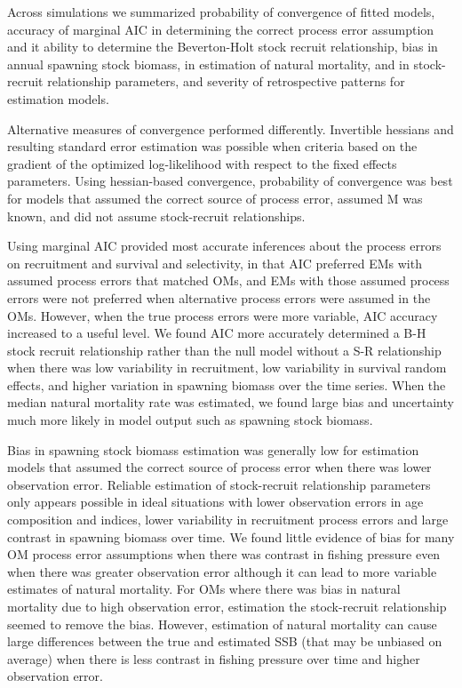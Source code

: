 \documentclass[
  12pt,
]{article}
\begin{document}
Across simulations we summarized probability of convergence of fitted
models, accuracy of marginal AIC in determining the correct process
error assumption and it ability to determine the Beverton-Holt stock
recruit relationship, bias in annual spawning stock biomass, in
estimation of natural mortality, and in stock-recruit relationship
parameters, and severity of retrospective patterns for estimation
models.

Alternative measures of convergence performed differently. Invertible
hessians and resulting standard error estimation was possible when
criteria based on the gradient of the optimized log-likelihood with
respect to the fixed effects parameters. Using hessian-based
convergence, probability of convergence was best for models that assumed
the correct source of process error, assumed M was known, and did not
assume stock-recruit relationships.

Using marginal AIC provided most accurate inferences about the process
errors on recruitment and survival and selectivity, in that AIC
preferred EMs with assumed process errors that matched OMs, and EMs with
those assumed process errors were not preferred when alternative process
errors were assumed in the OMs. However, when the true process errors
were more variable, AIC accuracy increased to a useful level. We found
AIC more accurately determined a B-H stock recruit relationship rather
than the null model without a S-R relationship when there was low
variability in recruitment, low variability in survival random effects,
and higher variation in spawning biomass over the time series. When the
median natural mortality rate was estimated, we found large bias and
uncertainty much more likely in model output such as spawning stock
biomass.

Bias in spawning stock biomass estimation was generally low for
estimation models that assumed the correct source of process error when
there was lower observation error. Reliable estimation of stock-recruit
relationship parameters only appears possible in ideal situations with
lower observation errors in age composition and indices, lower
variability in recruitment process errors and large contrast in spawning
biomass over time. We found little evidence of bias for many OM process
error assumptions when there was contrast in fishing pressure even when
there was greater observation error although it can lead to more
variable estimates of natural mortality. For OMs where there was bias in
natural mortality due to high observation error, estimation the
stock-recruit relationship seemed to remove the bias. However,
estimation of natural mortality can cause large differences between the
true and estimated SSB (that may be unbiased on average) when there is
less contrast in fishing pressure over time and higher observation
error.
\end{document}
